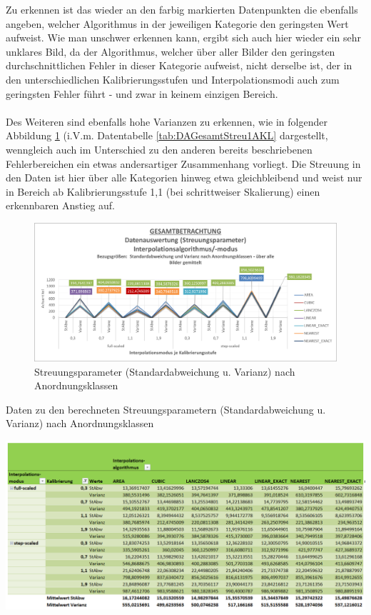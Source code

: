 \documentclass[
fontsize=10pt, 
listof = totoc,
parskip = half	
]{report}
\begin{document}
\noindent Zu erkennen ist das wieder an den farbig markierten Datenpunkten die ebenfalls angeben, welcher Algorithmus in der jeweiligen Kategorie den geringsten Wert aufweist. Wie man unschwer erkennen kann, ergibt sich auch hier wieder ein sehr unklares Bild, da der Algorithmus, welcher über aller Bilder den geringsten durchschnittlichen Fehler in dieser Kategorie aufweist, nicht derselbe ist, der in den unterschiedlichen Kalibrierungsstufen und Interpolationsmodi auch zum geringsten Fehler führt - und zwar in keinem einzigen Bereich.
\\\\
Des Weiteren sind ebenfalls hohe Varianzen zu erkennen, wie in folgender Abbildung \ref{fig:DAGesamtStreu1AKL} (i.V.m. Datentabelle \ref{tab:DAGesamtStreu1AKL} dargestellt, wenngleich auch im Unterschied zu den anderen bereits beschriebenen Fehlerbereichen ein etwas andersartiger Zusammenhang vorliegt. Die Streuung in den Daten ist hier über alle Kategorien hinweg etwa gleichbleibend und weist nur in Bereich ab Kalibrierungsstufe 1,1 (bei schrittweiser Skalierung) einen erkennbaren Anstieg auf.

\begin{figure}[H]
	\centering
	\includegraphics[width=\textwidth, height=\textheight, keepaspectratio]{pics/DA_Gesamt_Streu1_AKL}
	\caption{Streuungsparameter (Standardabweichung u. Varianz) nach Anordnungsklassen}
	\label{fig:DAGesamtStreu1AKL}
\end{figure}

\begin{table}[H]
	\caption{Daten zu den berechneten Streuungsparametern (Standardabweichung u. Varianz) nach Anordnungsklassen}
	\centering
	\includegraphics[width=\textwidth, height=\textheight, keepaspectratio]{pics/Tab_DA_Gesamt_Streu1_AKL}
	\label{tab:DAGesamtStreu1AKL}
\end{table}
\end{document}
